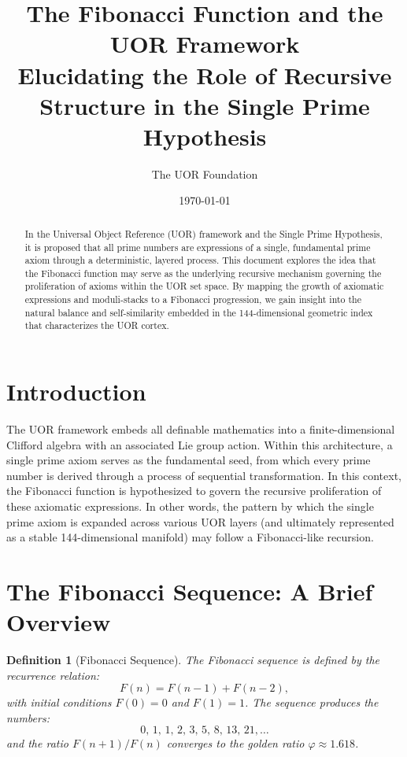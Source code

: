 \documentclass[11pt]{article}
\newtheorem{definition}{Definition}[section]
\begin{document}
\title{\textbf{The Fibonacci Function and the UOR Framework}\\
\large Elucidating the Role of Recursive Structure in the Single Prime Hypothesis}
\author{The UOR Foundation}
\date{\today}
\maketitle

\begin{abstract}
In the Universal Object Reference (UOR) framework and the Single Prime Hypothesis, it is proposed that all prime numbers are expressions of a single, fundamental prime axiom through a deterministic, layered process. This document explores the idea that the Fibonacci function may serve as the underlying recursive mechanism governing the proliferation of axioms within the UOR set space. By mapping the growth of axiomatic expressions and moduli-stacks to a Fibonacci progression, we gain insight into the natural balance and self-similarity embedded in the 144-dimensional geometric index that characterizes the UOR cortex.
\end{abstract}

\tableofcontents

\section{Introduction}
The UOR framework embeds all definable mathematics into a finite-dimensional Clifford algebra with an associated Lie group action. Within this architecture, a single prime axiom serves as the fundamental seed, from which every prime number is derived through a process of sequential transformation. In this context, the Fibonacci function is hypothesized to govern the recursive proliferation of these axiomatic expressions. In other words, the pattern by which the single prime axiom is expanded across various UOR layers (and ultimately represented as a stable 144-dimensional manifold) may follow a Fibonacci-like recursion.

\section{The Fibonacci Sequence: A Brief Overview}
\begin{definition}[Fibonacci Sequence]
The Fibonacci sequence is defined by the recurrence relation:
\[
F(n) = F(n-1) + F(n-2),
\]
with initial conditions \(F(0)=0\) and \(F(1)=1\). The sequence produces the numbers:
\[
0,\,1,\,1,\,2,\,3,\,5,\,8,\,13,\,21,\dots
\]
and the ratio \(F(n+1)/F(n)\) converges to the golden ratio \(\varphi \approx 1.618\).
\end{definition}
\end{document}
